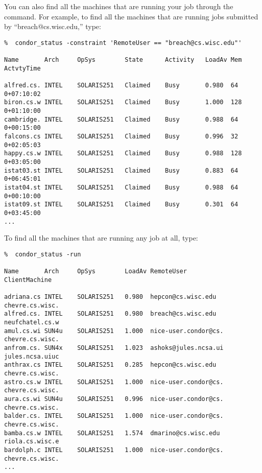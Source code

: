 You can also find all the machines that are running your job through the
 command.
For example, to find all the machines that are
running jobs submitted by ``breach@cs.wisc.edu,'' type:
\footnotesize
\begin{verbatim}
%  condor_status -constraint 'RemoteUser == "breach@cs.wisc.edu"'

Name       Arch     OpSys        State      Activity   LoadAv Mem  ActvtyTime

alfred.cs. INTEL    SOLARIS251   Claimed    Busy       0.980  64    0+07:10:02
biron.cs.w INTEL    SOLARIS251   Claimed    Busy       1.000  128   0+01:10:00
cambridge. INTEL    SOLARIS251   Claimed    Busy       0.988  64    0+00:15:00
falcons.cs INTEL    SOLARIS251   Claimed    Busy       0.996  32    0+02:05:03
happy.cs.w INTEL    SOLARIS251   Claimed    Busy       0.988  128   0+03:05:00
istat03.st INTEL    SOLARIS251   Claimed    Busy       0.883  64    0+06:45:01
istat04.st INTEL    SOLARIS251   Claimed    Busy       0.988  64    0+00:10:00
istat09.st INTEL    SOLARIS251   Claimed    Busy       0.301  64    0+03:45:00
...
\end{verbatim}
\normalsize
To find all the machines that are running any job at all, type:
\footnotesize
\begin{verbatim}
%  condor_status -run

Name       Arch     OpSys        LoadAv RemoteUser           ClientMachine  

adriana.cs INTEL    SOLARIS251   0.980  hepcon@cs.wisc.edu   chevre.cs.wisc.
alfred.cs. INTEL    SOLARIS251   0.980  breach@cs.wisc.edu   neufchatel.cs.w
amul.cs.wi SUN4u    SOLARIS251   1.000  nice-user.condor@cs. chevre.cs.wisc.
anfrom.cs. SUN4x    SOLARIS251   1.023  ashoks@jules.ncsa.ui jules.ncsa.uiuc
anthrax.cs INTEL    SOLARIS251   0.285  hepcon@cs.wisc.edu   chevre.cs.wisc.
astro.cs.w INTEL    SOLARIS251   1.000  nice-user.condor@cs. chevre.cs.wisc.
aura.cs.wi SUN4u    SOLARIS251   0.996  nice-user.condor@cs. chevre.cs.wisc.
balder.cs. INTEL    SOLARIS251   1.000  nice-user.condor@cs. chevre.cs.wisc.
bamba.cs.w INTEL    SOLARIS251   1.574  dmarino@cs.wisc.edu  riola.cs.wisc.e
bardolph.c INTEL    SOLARIS251   1.000  nice-user.condor@cs. chevre.cs.wisc.
...
\end{verbatim}
\normalsize

